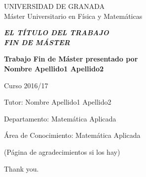 \quad

\thispagestyle{empty}


\newpage 



\thispagestyle{empty}


\begin{center}

{\Large UNIVERSIDAD DE GRANADA}\\[10mm]
{\Large\sffamily M\'aster Universitario en F\'isica y Matem\'aticas}\\[3mm]


\vspace{3cm}


\begin{Large}
{\slshape\bfseries  EL T\'ITULO DEL TRABAJO\\[6mm]
FIN DE M\'ASTER}
\end{Large}

\vspace{3cm}

\vfill

\begin{large}
{\bf Trabajo Fin de M\'aster presentado por \\[3mm]
Nombre Apellido1 Apellido2}
\end{large}


\vspace{2cm}

\begin{Large}
Curso 2016/17
\end{Large}
\end{center}

\vfill

\noindent
Tutor: Nombre Apellido1 Apellido2

\noindent
Departamento: Matem\'atica Aplicada

\noindent
\'Area de Conocimiento: Matem\'atica Aplicada

\newpage


\thispagestyle{empty}

\quad

\newpage

\thispagestyle{empty}

\vspace*{2cm}

\begin{flushright}
\parbox{3.5in}
{\small
(P\'agina de agradecimientos si los hay)


Thank you.}

\end{flushright}

\newpage

